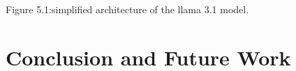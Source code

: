 \documentclass[12pt,a4paper]{report}
\begin{document}
Figure 5.1:simplified architecture  of the llama 3.1 model.













































\chapter{Conclusion and Future Work}
\end{document}
